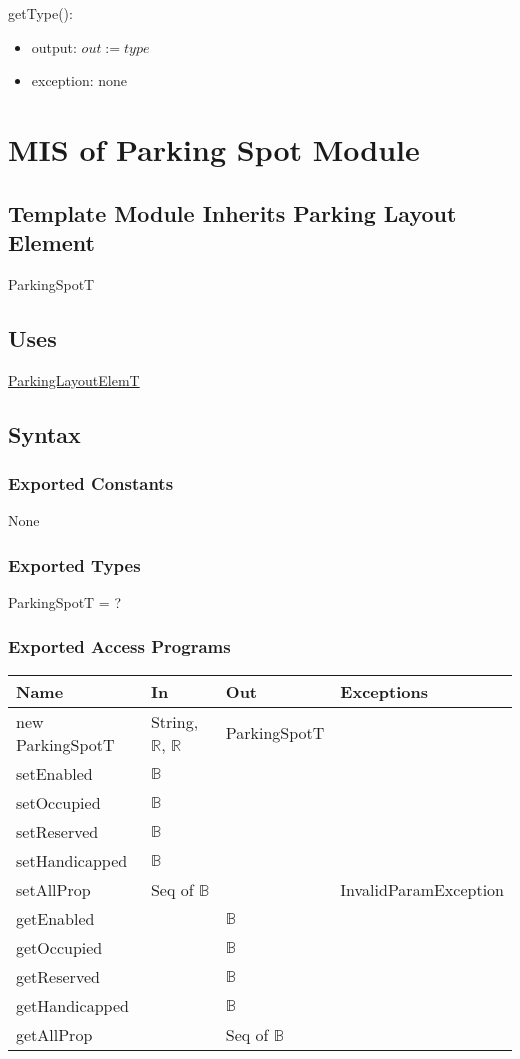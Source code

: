 \documentclass[12pt, titlepage]{article}
\begin{document}
\noindent getType():
\begin{itemize} 
\item output: $out := type$
\item exception: none
\end{itemize}

\newpage

\section{MIS of Parking Spot Module} 
\label{parkingSpot:Module}

\subsection{Template Module Inherits Parking Layout Element}
ParkingSpotT

\subsection{Uses}
\hyperref[parkingLayoutElem:Module]{ParkingLayoutElemT}

\subsection{Syntax}

\subsubsection{Exported Constants}
None

\subsubsection{Exported Types}
ParkingSpotT = ?

\subsubsection{Exported Access Programs}

\begin{tabular}{l l l l}
\hline
\textbf{Name} & \textbf{In} & \textbf{Out} & \textbf{Exceptions} \\
\hline
new ParkingSpotT & String, $\mathbb{R}$, $\mathbb{R}$ & ParkingSpotT & ~ \\
setEnabled & $\mathbb{B}$ & ~ & ~\\
setOccupied & $\mathbb{B}$ & ~ & ~\\
setReserved & $\mathbb{B}$ & ~ & ~\\
setHandicapped & $\mathbb{B}$ & ~ & ~\\
setAllProp & Seq of $\mathbb{B}$ & ~ & InvalidParamException\\
getEnabled & ~ & $\mathbb{B}$ & ~\\
getOccupied & ~ & $\mathbb{B}$ & ~\\
getReserved & ~ & $\mathbb{B}$ & ~\\
getHandicapped & ~ & $\mathbb{B}$ & ~\\
getAllProp & ~ & Seq of $\mathbb{B}$ & ~\\
\hline
\end{tabular}
\end{document}
